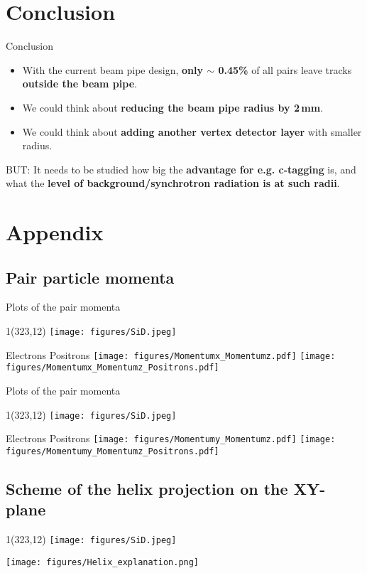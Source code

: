 \documentclass[xcolor={dvipsnames}]{beamer}
\newcommand{\sidlogo}{
  \setlength{\TPHorizModule}{1pt}
  \setlength{\TPVertModule}{1pt}
  \begin{textblock}{1}(323,12)
   \texttt{[image: figures/SiD.jpeg]}
  \end{textblock}
  }
\begin{document}
\section{Conclusion}
\begin{frame}{Conclusion}
\begin{itemize}
 \item With the current beam pipe design, \textbf{only $\sim$ 0.45\%} of all pairs leave tracks \textbf{outside the beam pipe}.
 \item We could think about \textbf{reducing the beam pipe radius by 2\,mm}.
 \item We could think about \textbf{adding another vertex detector layer} with smaller radius.
\end{itemize}
BUT:
It needs to be studied how big the \textbf{advantage for e.g. c-tagging} is,
and what the \textbf{level of background/synchrotron radiation is at such radii}.
 
\end{frame}

\section*{Appendix}
\subsection*{Pair particle momenta}
\begin{frame}{Plots of the pair momenta}
\sidlogo
 \begin{center}
 \hspace*{0.5cm} Electrons \hspace*{4.5cm} Positrons
\texttt{[image: figures/Momentumx\_Momentumz.pdf]}
\texttt{[image: figures/Momentumx\_Momentumz\_Positrons.pdf]}
\end{center}
\end{frame}
\begin{frame}{Plots of the pair momenta}
\sidlogo
 \begin{center}
 \hspace*{0.5cm} Electrons \hspace*{4.5cm} Positrons
\texttt{[image: figures/Momentumy\_Momentumz.pdf]}
\texttt{[image: figures/Momentumy\_Momentumz\_Positrons.pdf]}
\end{center}
\end{frame}
\subsection*{Scheme of the helix projection on the XY-plane}
\begin{frame}
\sidlogo
 \begin{center}
\texttt{[image: figures/Helix\_explanation.png]}
\end{center}
\end{frame}
\end{document}
